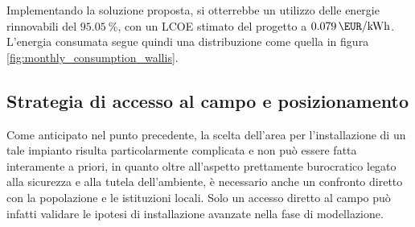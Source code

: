 \documentclass[fleqn,11pt]{SelfArx} %
\begin{document}
Implementando la soluzione proposta, si otterrebbe un utilizzo delle energie rinnovabili del \(\SI{95.05}{\percent}\), con un LCOE stimato del progetto a \(\SI {0.079}{\EUR\per\kWh}\). L'energia consumata segue quindi una distribuzione come quella in figura \ref{fig:monthly_consumption_wallis}. \\
\begin{figure*}[ht]\centering
	\caption{Consumo mensile per tecnologia nell'isola di Wallis}
	\label{fig:monthly_consumption_wallis}
\end{figure*}

\subsection{Strategia di accesso al campo e posizionamento}
Come anticipato nel punto precedente, la scelta dell'area per l'installazione di un tale impianto risulta particolarmente complicata e non può essere fatta interamente a priori, in quanto oltre all'aspetto prettamente burocratico legato alla sicurezza e alla tutela dell'ambiente, è necessario anche un confronto diretto con la popolazione e le istituzioni locali. 
Solo un accesso diretto al campo può infatti validare le ipotesi di installazione avanzate nella fase di modellazione. 
\end{document}
